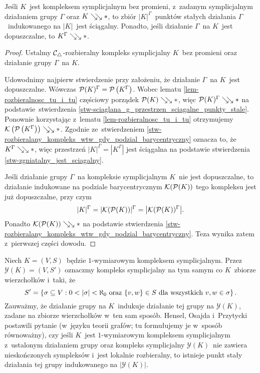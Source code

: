 \begin{stw}\label{stw-rozbieralny_g_kompleks_rozbieralne_punkty_stale}
Jeśli $K$~jest kompleksem symplicjalnym bez promieni, z~zadanym symplicjalnym działaniem grupy $\Gamma$ oraz \mbox{$K\searrow\!\!\searrow *$}, to zbiór $|K|^\Gamma$~punktów stałych działania $\Gamma$~indukowanego na $|K|$~jest ściągalny. Ponadto, jeśli działanie $\Gamma$~na $K$~jest dopuszczalne, to $K^\Gamma\searrow\!\!\searrow *$.
\end{stw}
\begin{proof}
Ustalmy $\mathcal{C}_\triangle$-rozbieralny kompleks symplicjalny $K$~bez promieni oraz działanie grupy $\Gamma$~na $K$.

Udowodnimy najpierw stwierdzenie przy założeniu, że działanie $\Gamma$~na $K$~jest dopuszczalne. Wówczas $\mathcal{P}(K)^\Gamma=\mathcal{P}\left(K^\Gamma\right)$. Wobec lematu \ref{lem-rozbieralnosc_tu_i_tu} częściowy porządek $\mathcal{P}(K)\searrow\!\!\searrow *$, więc $\mathcal{P}(K)^\Gamma\searrow\!\!\searrow *$ na podstawie~stwierdzenia \ref{stw-sciaglana_g_przestrzen_sciagalne_punkty_stale}. Ponownie korzystając z~lematu \ref{lem-rozbieralnosc_tu_i_tu} otrzymujemy $\mathcal{K}\left(\mathcal{P}\left(K^\Gamma\right)\right)\searrow\!\!\searrow *$. Zgodnie ze~stwierdzeniem \ref{stw-rozbieralany_kompleks_wtw_gdy_podzial_barycentryczny} oznacza to, że $K^\Gamma\searrow\!\!\searrow *$, więc przestrzeń $|K|^\Gamma=|K^\Gamma|$ jest ściągalna na podstawie stwierdzenia \ref{stw-zgniatalny_jest_sciagalny}.

Jeśli działanie grupy $\Gamma$~na kompleksie symplicjalnym $K$~nie jest dopuszczalne, to działanie indukowane na podziale barycentrycznym $\mathcal{K}(\mathcal{P}(K))$ tego kompleksu jest już dopuszczalne, przy czym \[|K|^\Gamma=|\mathcal{K}(\mathcal{P}(K))|^\Gamma=\bigl|\mathcal{K}(\mathcal{P}(K))^\Gamma\bigr|.\] Ponadto $\mathcal{K}(\mathcal{P}(K))\searrow\!\!\searrow *$ na podstawie stwierdzenia \ref{stw-rozbieralany_kompleks_wtw_gdy_podzial_barycentryczny}. Teza wynika zatem z~pierwszej części dowodu.
\end{proof}


Niech $K=(V,S)$~będzie $1$-wymiarowym kompleksem symplicjalnym. Przez $\mathcal{Y}(K)=\left(V,S'\right)$ oznaczmy kompleks symplicjalny na tym samym co $K$~zbiorze wierzchołków i~taki, że \[S'=\left\{\sigma\subseteq V:0<\left|\sigma\right|<\aleph_0 \text{ oraz }\{v,w\}\in S\text{ dla wszystkich } v,w\in\sigma\right\}.\] Zauważmy, że działanie grupy na $K$~indukuje działanie tej grupy na $\mathcal{Y}(K)$, zadane na zbiorze wierzchołków w~ten sam sposób.
Hensel, Osajda i~Przytycki \cite[Question 2.11]{Hensel14} postawili  pytanie (w~języku teorii grafów; tu formułujemy je w~sposób równoważny), czy jeśli $K$~jest \mbox{$1$-wymiarowym} kompleksem symplicjalnym z~ustalonym działaniem grupy oraz kompleks symplicjalny $\mathcal{Y}(K)$~nie zawiera nieskończonych sympleksów i~jest lokalnie rozbieralny, to istnieje punkt stały działania tej grupy indukowanego na $|\mathcal{Y}(K)|$.

